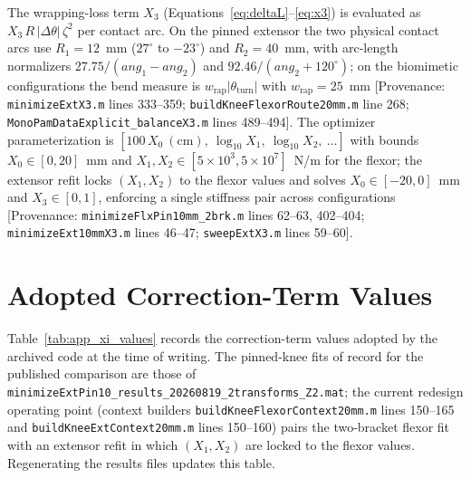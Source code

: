 The wrapping-loss term $X_{3}$ (Equations~\ref{eq:deltaL}--\ref{eq:x3}) is evaluated as $X_{3}\,R\,\lvert\Delta\theta\rvert\,\zeta^{2}$ per contact arc. On the pinned extensor the two physical contact arcs use $R_{1} = 12$~mm ($27^{\circ}$ to $-23^{\circ}$) and $R_{2} = 40$~mm, with arc-length normalizers $27.75/(ang_{1} - ang_{2})$ and $92.46/(ang_{2}+120^{\circ})$; on the biomimetic configurations the bend measure is $w_{\text{rap}}\lvert\theta_{\text{turn}}\rvert$ with $w_{\text{rap}} = 25$~mm [Provenance: \texttt{minimizeExtX3.m} lines 333--359; \texttt{buildKneeFlexorRoute20mm.m} line 268; \texttt{MonoPamDataExplicit\_balanceX3.m} lines 489--494]. The optimizer parameterization is $[100\,X_{0}\ (\text{cm}),\ \log_{10}X_{1},\ \log_{10}X_{2},\ \ldots]$ with bounds $X_{0}\in[0, 20]$~mm and $X_{1}, X_{2}\in[5\times10^{3}, 5\times10^{7}]$~N/m for the flexor; the extensor refit locks $(X_{1}, X_{2})$ to the flexor values and solves $X_{0}\in[-20, 0]$~mm and $X_{3}\in[0, 1]$, enforcing a single stiffness pair across configurations [Provenance: \texttt{minimizeFlxPin10mm\_2brk.m} lines 62--63, 402--404; \texttt{minimizeExt10mmX3.m} lines 46--47; \texttt{sweepExtX3.m} lines 59--60].

\section{Adopted Correction-Term Values}

Table~\ref{tab:app_xi_values} records the correction-term values adopted by the archived code at the time of writing. The pinned-knee fits of record for the published comparison are those of \texttt{minimizeExtPin10\_results\_20260819\_2transforms\_Z2.mat}; the current redesign operating point (context builders \texttt{buildKneeFlexorContext20mm.m} lines 150--165 and \texttt{buildKneeExtContext20mm.m} lines 150--160) pairs the two-bracket flexor fit with an extensor refit in which $(X_{1}, X_{2})$ are locked to the flexor values. Regenerating the results files updates this table.


